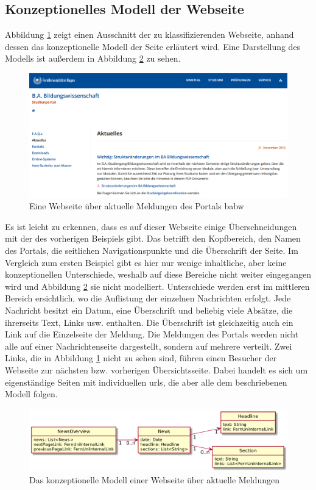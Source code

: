 \subsection{Konzeptionelles Modell der Webseite}
    Abbildung \ref{image:findingNewsModelOverview} zeigt einen
    Ausschnitt der zu klassifizierenden Webseite,
    anhand dessen das konzeptionelle Modell der Seite erläutert wird.
    Eine Darstellung des Modells ist außerdem in Abbildung
    \ref{image:findingNewsModelUml} zu sehen.

    \begin{figure}[htb]
        \centering
        \includegraphics[width=\textwidth]{../resources/findings/case-study-2/news-overview.png}
        \caption{Eine Webseite über aktuelle Meldungen des Portals \acrshort{babw}}
        \label{image:findingNewsModelOverview}
    \end{figure}

    Es ist leicht zu erkennen, dass es auf dieser Webseite einige Überschneidungen
    mit der des vorherigen Beispiels gibt.
    Das betrifft den Kopfbereich, den Namen des Portals,
    die seitlichen Navigationspunkte und die Überschrift der Seite.
    Im Vergleich zum ersten Beispiel gibt es hier nur wenige inhaltliche,
    aber keine konzeptionellen Unterschiede,
    weshalb auf diese Bereiche nicht weiter eingegangen wird und Abbildung
    \ref{image:findingNewsModelUml} sie nicht modelliert.
    Unterschiede werden erst im mittleren Bereich ersichtlich,
    wo die Auflistung der einzelnen Nachrichten erfolgt.
    Jede Nachricht besitzt ein Datum, eine Überschrift und beliebig viele Absätze,
    die ihrerseits Text, Links usw. enthalten.
    Die Überschrift ist gleichzeitig auch ein Link auf die Einzelseite der Meldung.
    Die Meldungen des Portals werden nicht alle auf einer Nachrichtenseite dargestellt,
    sondern auf mehrere verteilt.
    Zwei Links, die in Abbildung \ref{image:findingNewsModelOverview} nicht zu sehen sind,
    führen einen Besucher der Webseite zur nächsten bzw. vorherigen Übersichtsseite.
    Dabei handelt es sich um eigenständige Seiten mit individuellen \glspl{url},
    die aber alle dem beschriebenen Modell folgen.

    \begin{figure}[tb]
        \centering
        \includegraphics[scale=\imageScalingFactor]{../resources/findings/case-study-2/model.png}
        \caption{Das konzeptionelle Modell einer Webseite über aktuelle Meldungen}
        \label{image:findingNewsModelUml}
    \end{figure}